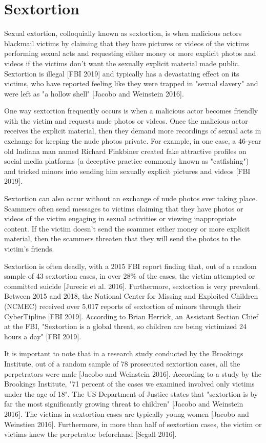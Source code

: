 \documentclass[class=book, crop=false]{standalone}
\begin{document}
\section{Sextortion}

Sexual extortion, colloquially known as sextortion, is when malicious actors blackmail victims by claiming that they have pictures or videos of the victims performing sexual acts and requesting either money or more explicit photos and videos if the victims don't want the sexually explicit material made public. Sextortion is illegal [FBI 2019] and typically has a devastating effect on its victims, who have reported feeling like they were trapped in "sexual slavery" and were left as "a hollow shell" [Jacobo and Weinstein 2016].

One way sextortion frequently occurs is when a malicious actor becomes friendly with the victim and requests nude photos or videos. Once the malicious actor receives the explicit material, then they demand more recordings of sexual acts in exchange for keeping the nude photos private. For example, in one case, a 46-year old Indiana man named Richard Finkbiner created fake attractive profiles on social media platforms (a deceptive practice commonly known as "catfishing") and tricked minors into sending him sexually explicit pictures and videos [FBI 2019].

Sextortion can also occur without an exchange of nude photos ever taking place. Scammers often send messages to victims claiming that they have photos or videos of the victim engaging in sexual activities or viewing inappropriate content. If the victim doesn't send the scammer either money or more explicit material, then the scammers threaten that they will send the photos to the victim's friends.

Sextortion is often deadly, with a 2015 FBI report finding that, out of a random sample of 43 sextortion cases, in over 28\% of the cases, the victim attempted or committed suicide [Jurecic et al. 2016]. Furthermore, sextortion is very prevalent. Between 2015 and 2018, the National Center for Missing and Exploited Children (NCMEC) received over 5,017 reports of sextortion of minors through their CyberTipline [FBI 2019]. According to Brian Herrick, an Assistant Section Chief at the FBI, "Sextortion is a global threat, so children are being victimized 24 hours a day" [FBI 2019].

It is important to note that in a research study conducted by the Brookings Institute, out of a random sample of 78 prosecuted sextortion cases, all the perpetrators were male [Jacobo and Weinstein 2016]. According to a study by the Brookings Institute, "71 percent of the cases we examined involved only victims under the age of 18". The US Department of Justice states that "sextortion is by far the most significantly growing threat to children" [Jacobo and Weinstein 2016]. The victims in sextortion cases are typically young women [Jacobo and Weinstien 2016]. Furthermore, in more than half of sextortion cases, the victim or victims knew the perpetrator beforehand [Segall 2016].
\end{document}
